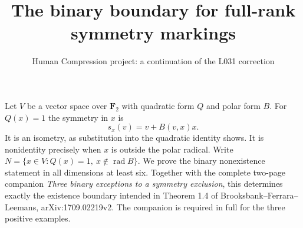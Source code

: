 \documentclass[11pt,a4paper]{article}
\title{The binary boundary for full-rank symmetry markings}
\author{Human Compression project: a continuation of the L031 correction}
\date{}
\begin{document}
\maketitle
Let $V$ be a vector space over $\mathbf F_2$ with quadratic form $Q$
and polar form $B$. For $Q(x)=1$ the symmetry in $x$ is
\[
 s_x(v)=v+B(v,x)x.
\]
It is an isometry, as substitution into the quadratic identity shows.
It is nonidentity precisely when $x$ is outside the polar radical.
Write $N=\{x\in V:Q(x)=1,\ x\notin\operatorname{rad}B\}$.
We prove the binary nonexistence statement in all dimensions at least
six. Together with the complete two-page companion \emph{Three binary
exceptions to a symmetry exclusion}, this determines exactly the
existence boundary intended in Theorem 1.4 of
Brooksbank--Ferrara--Leemans, arXiv:1709.02219v2.
The companion is required in full for the three positive examples.
\end{document}
